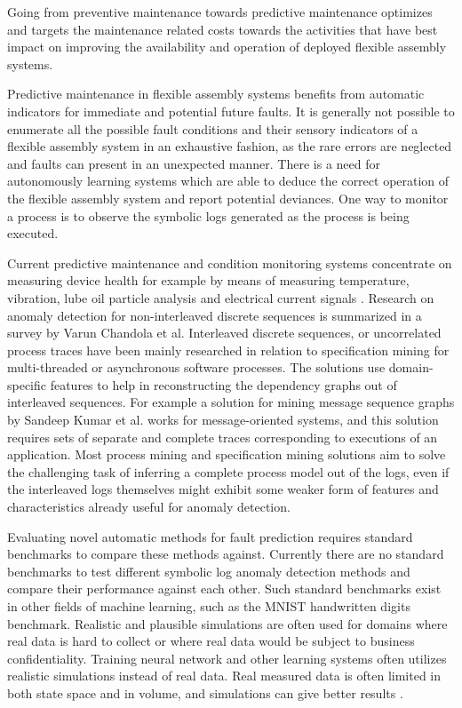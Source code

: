 \documentclass[procedia]{easychair}
\begin{document}
Going from preventive maintenance towards predictive maintenance optimizes and targets the maintenance related costs towards the activities that have best impact
on improving the availability and operation of deployed flexible assembly systems.

Predictive maintenance in flexible assembly systems benefits from automatic indicators for immediate and potential future faults.
It is generally not possible to enumerate all the possible fault conditions and their sensory indicators of a flexible assembly system in an exhaustive fashion,
as the rare errors are neglected and faults can present in an unexpected manner\cite{camarinha1996integration}.
There is a need for autonomously learning systems which are able to deduce the correct operation of the flexible assembly system and report potential deviances. One way to monitor a process is to observe the symbolic
logs generated as the process is being executed.

Current predictive maintenance and condition monitoring systems concentrate on measuring device health for example by means of measuring temperature\cite{mobley2002introduction},
vibration\cite{scheffer2004practical}, lube oil particle analysis\cite{hunt1993handbook} and electrical current signals
\cite{thomson2001current}. Research on anomaly detection for non-interleaved discrete sequences is summarized in a survey by Varun Chandola et al.\cite{chandola2012anomaly}
Interleaved discrete sequences, or uncorrelated process traces have been mainly researched in relation to specification mining for multi-threaded or asynchronous software processes.
The solutions use domain-specific features to help in reconstructing the dependency graphs out of interleaved sequences. For example a solution for mining message sequence graphs by Sandeep Kumar et al.\cite{kumar2011mining}
works for message-oriented systems,
and this solution requires sets of separate and complete traces corresponding to executions of an application\cite{mining-program-workflow-from-interleaved-traces}. Most process mining and specification mining
solutions aim to solve the challenging task of inferring a complete process model out of the logs, even if the interleaved logs themselves might exhibit some weaker form of features
and characteristics already useful for anomaly detection.

Evaluating novel automatic methods for fault prediction requires standard benchmarks to compare these methods against. Currently there are no standard benchmarks to test
different symbolic log anomaly detection methods and compare their performance against each other. Such standard benchmarks exist in other fields of machine learning,
such as the MNIST handwritten digits benchmark\cite{lecun-mnisthandwrittendigit-2010}. Realistic and plausible simulations are often used\cite{jager2014assessing}\cite{FASTTRIPS} for domains where
real data is hard to collect or where real data would be subject to business confidentiality. Training neural network and other learning systems often utilizes realistic
simulations instead of real data\cite{weston2014memory}. Real measured data is often limited in both state space and in volume,
and simulations can give better results \cite{duch2005artificial}.
\end{document}
